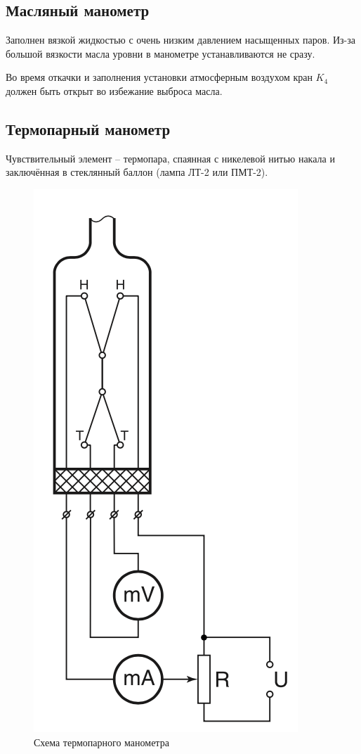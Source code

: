 \documentclass[a4paper,12pt]{article} %
\begin{document}
\subsection*{Масляный манометр}

Заполнен вязкой жидкостью с очень низким давлением насыщенных паров. Из-за большой вязкости масла уровни в манометре устанавливаются не сразу.

Во время откачки и заполнения установки атмосферным воздухом кран $K_4$ должен быть открыт во избежание выброса масла. 

\subsection*{Термопарный манометр}

Чувствительный элемент – термопара, спаянная с никелевой нитью накала и заключённая в стеклянный баллон (лампа ЛТ-2 или ПМТ-2).

\begin{figure}[h] %
  \centering
  \includegraphics[scale = 0.5]{thermo_scheme.png}
  \caption{Схема термопарного манометра}
  \label{fig:thermo_scheme}
\end{figure}
\end{document}
